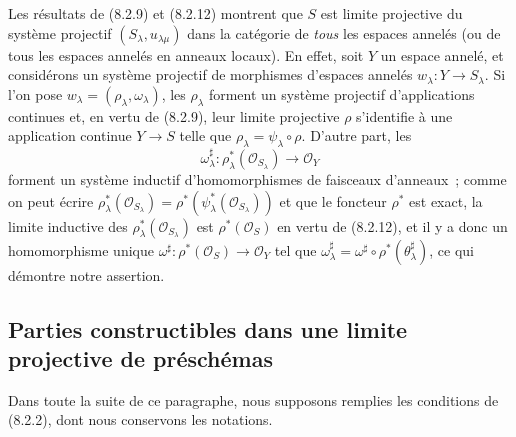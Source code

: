 \begin{remark}[8.2.14]
\label{IV.8.2.14-fr}
Les résultats de (8.2.9) et (8.2.12) montrent que $S$ est limite projective du
système projectif $(S_\lambda,u_{\lambda\mu})$ dans la catégorie de
\emph{tous} les espaces annelés (ou de tous les espaces annelés en anneaux
locaux). En effet, soit $Y$ un espace annelé, et considérons un système
projectif de morphismes d'espaces annelés $w_\lambda:Y\to S_\lambda$. Si
l'on pose $w_\lambda=(\rho_\lambda,\omega_\lambda)$, les $\rho_\lambda$
forment un système projectif d'applications continues et, en vertu de
(8.2.9), leur limite projective $\rho$ s'identifie à une application continue
$Y\to S$ telle que $\rho_\lambda=\psi_\lambda\circ\rho$. D'autre part, les
\[
\omega_\lambda^\sharp:
\rho_\lambda^*(\mathcal O_{S_\lambda})\to\mathcal O_Y
\]
forment un système inductif d'homomorphismes de faisceaux d'anneaux~; comme
on peut écrire
$\rho_\lambda^*(\mathcal O_{S_\lambda})=
\rho^*(\psi_\lambda^*(\mathcal O_{S_\lambda}))$ et que le foncteur $\rho^*$
est exact, la limite inductive des
$\rho_\lambda^*(\mathcal O_{S_\lambda})$ est $\rho^*(\mathcal O_S)$ en
vertu de (8.2.12), et il y a donc un homomorphisme unique
$\omega^\sharp:\rho^*(\mathcal O_S)\to\mathcal O_Y$ tel que
$\omega_\lambda^\sharp=\omega^\sharp\circ
\rho^*(\theta_\lambda^\sharp)$, ce qui démontre notre assertion.
\end{remark}

\subsection{Parties constructibles dans une limite projective de préschémas}
\label{subsection:IV.8.3-fr}

\begin{env}[8.3.1]
\label{IV.8.3.1-fr}
Dans toute la suite de ce paragraphe, nous supposons remplies les conditions
de (8.2.2), dont nous conservons les notations.
\end{env}

